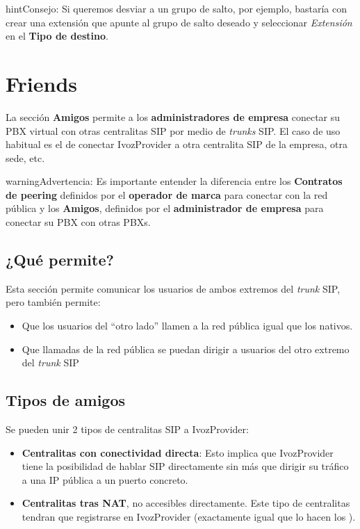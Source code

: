 \documentclass[letterpaper,10pt,spanish]{sphinxmanual}
\begin{document}
\begin{notice}{hint}{Consejo:}
Si queremos desviar a un grupo de salto, por ejemplo, bastaría con crear una extensión que apunte al grupo de salto deseado y seleccionar \emph{Extensión} en el \textbf{Tipo de destino}.
\end{notice}


\section{Friends}
\label{pbx_features/friends:friends}\label{pbx_features/friends::doc}
La sección \textbf{Amigos} permite a los \textbf{administradores de empresa} conectar su PBX virtual con otras centralitas SIP por medio de \emph{trunks} SIP. El caso de uso habitual es el de conectar IvozProvider a otra centralita SIP de la empresa, otra sede, etc.

\begin{notice}{warning}{Advertencia:}
Es importante entender la diferencia entre los \textbf{Contratos de peering} definidos por el \textbf{operador de marca} para conectar con la red pública y los \textbf{Amigos}, definidos por el \textbf{administrador de empresa} para conectar su PBX con otras PBXs.
\end{notice}


\subsection{¿Qué permite?}
\label{pbx_features/friends:what-does-this-allow}
Esta sección permite comunicar los usuarios de ambos extremos del \emph{trunk} SIP, pero también permite:
\begin{itemize}
\item {} 
Que los usuarios del ``otro lado'' llamen a la red pública igual que los {\hyperref[pbx_features/users:users\string-configuration]{}} nativos.

\item {} 
Que llamadas de la red pública se puedan dirigir a usuarios del otro extremo del \emph{trunk} SIP

\end{itemize}


\subsection{Tipos de amigos}
\label{pbx_features/friends:types-of-friends}
Se pueden unir 2 tipos de centralitas SIP a IvozProvider:
\begin{itemize}
\item {} 
\textbf{Centralitas con conectividad directa}: Esto implica que IvozProvider tiene la posibilidad de hablar SIP directamente sin más que dirigir su tráfico a una IP pública a un puerto concreto.

\item {} 
\textbf{Centralitas tras NAT}, no accesibles directamente. Este tipo de centralitas tendran que registrarse en IvozProvider (exactamente igual que lo hacen los {\hyperref[pbx_features/terminals:terminals]{}}).

\end{itemize}
\end{document}
